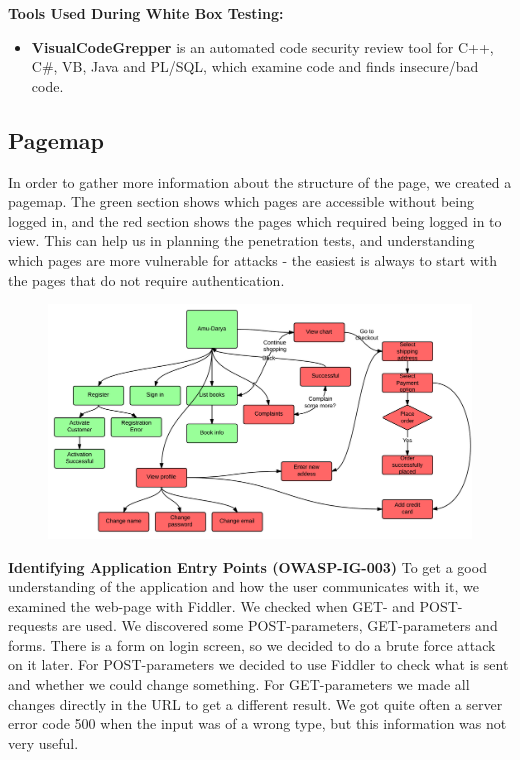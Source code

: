{\bf Tools Used During White Box Testing:}
\begin{itemize}
	\item {\bf VisualCodeGrepper} is an automated code security review tool for C++, C\#, VB, Java and PL/SQL, which examine code and finds insecure/bad code.
\end{itemize}

\newpage

\subsection{Pagemap}
In order to gather more information about the structure of the page, we created a pagemap. The green section shows which pages are accessible without being logged in, and the red section shows the pages which required being logged in to view. This can help us in planning the penetration tests, and understanding which pages are more vulnerable for attacks - the easiest is always to start with the pages that do not require authentication.

\begin{figure}[!ht]
\centering
\includegraphics[scale=0.18, angle=90]{pics/Pagemap.png}
\end{figure}

{\bf Identifying Application Entry Points (OWASP-IG-003)}
To get a good understanding of the application and how the user communicates with it, we examined the web-page with Fiddler. We checked when GET- and POST-requests are used. We discovered some POST-parameters, GET-parameters and forms. There is a form on login screen, so we decided to do a brute force attack on it later. For POST-parameters we decided to use Fiddler to check what is sent and whether we could change something. For GET-parameters we made all changes directly in the URL to get a different result. We got quite often a server error code 500 when the input was of a wrong type, but this information was not very useful.
